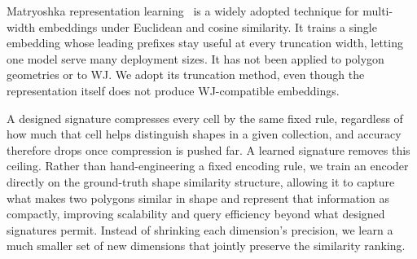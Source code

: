 \documentclass[conference]{IEEEtran}
\newcommand{\rs}[1]{\textcolor{green!55!black}{[RS: #1]}}
\newcommand{\ba}[1]{\textcolor{orange}{[BA: #1]}}
\begin{document}
Matryoshka representation
learning~\cite{matryoshka22} is a widely adopted technique for multi-width
embeddings under Euclidean and cosine similarity. It trains a single embedding whose
leading prefixes stay useful at every truncation width, letting one model serve many
deployment sizes. It has not been applied to polygon geometries or to WJ. We adopt its truncation method, even though the
representation itself does not produce WJ-compatible embeddings.


A designed signature compresses
every cell by the same fixed rule, regardless of how much that cell helps
distinguish shapes in a given collection, and accuracy therefore drops once
compression is pushed far. A learned signature removes this ceiling. Rather than hand-engineering a fixed encoding
rule, we train an encoder directly on the ground-truth shape similarity structure,
allowing it to capture what makes two polygons similar in shape and represent that information
as compactly, improving scalability and query efficiency beyond
what designed signatures permit. Instead of shrinking each dimension's precision, we learn a much
smaller set of new dimensions that jointly preserve the similarity ranking.

\end{document}
